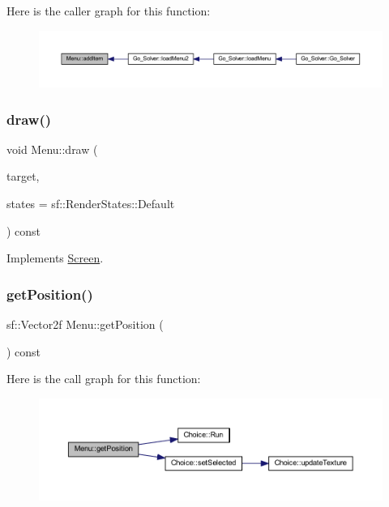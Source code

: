 Here is the caller graph for this function\+:
\nopagebreak
\begin{figure}[H]
\begin{center}
\leavevmode
\includegraphics[width=350pt]{class_menu_aa8032782ee75fba5fa17bf7a20635c68_icgraph}
\end{center}
\end{figure}
\mbox{\label{class_menu_a7bc75c51f0ae43faeb694b8a0c4c7d16}} 
\subsubsection{\texorpdfstring{draw()}{draw()}}
{\footnotesize\ttfamily void Menu\+::draw (\begin{DoxyParamCaption}\item[{sf\+::\+Render\+Target \&}]{target,  }\item[{sf\+::\+Render\+States}]{states = {\ttfamily sf\+:\+:RenderStates\+:\+:Default} }\end{DoxyParamCaption}) const\hspace{0.3cm}{\ttfamily [virtual]}}



Implements \hyperlink{class_screen_abcb5544dfe717c7da181520803f43e25}{Screen}.

\mbox{\label{class_menu_a589f53bbd6436b381b5ec92a609d5d66}} 
\subsubsection{\texorpdfstring{get\+Position()}{getPosition()}}
{\footnotesize\ttfamily sf\+::\+Vector2f Menu\+::get\+Position (\begin{DoxyParamCaption}{ }\end{DoxyParamCaption}) const}

Here is the call graph for this function\+:
\nopagebreak
\begin{figure}[H]
\begin{center}
\leavevmode
\includegraphics[width=350pt]{class_menu_a589f53bbd6436b381b5ec92a609d5d66_cgraph}
\end{center}
\end{figure}
\mbox{\label{class_menu_ad99768326c994acf4fba6d9df60d1bcc}} 
